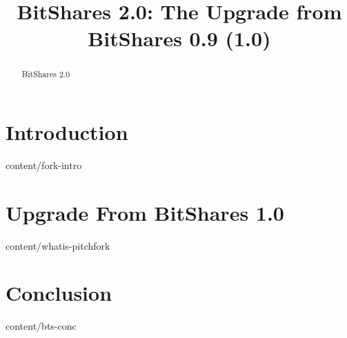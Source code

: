 \documentclass[conference,final,10pt,a4paper]{IEEEtran}
\title{BitShares 2.0: The Upgrade from BitShares 0.9 (1.0)}
\begin{document}
\sloppy
\maketitle

\begin{abstract}

 BitShares 2.0 

\end{abstract}

\section       { Introduction                      }  { content/fork-intro          } 

\section       { Upgrade From BitShares 1.0        }  { content/whatis-pitchfork    } 

\section       { Conclusion                        }  { content/bts-conc            } 


\end{document}

